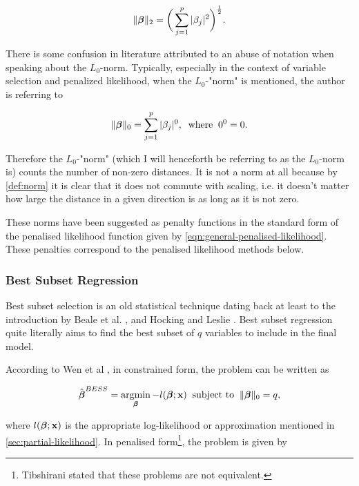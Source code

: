 \begin{definition}\label{def:euclidean-distance}
\begin{equation}\label{eqn:euclidean-distance}
    \Vert\boldsymbol{\beta}\Vert_2 = \bigg(\sum_{j=1}^p|\beta_j|^2\bigg)^{\frac{1}{2}}.
\end{equation}
\end{definition}

There is some confusion in literature attributed to an abuse of notation when speaking about the $L_0$-norm. Typically, especially in the context of variable selection and penalized likelihood, when the $L_0$-"norm" is mentioned, the author is referring to

\begin{equation}
    \Vert\boldsymbol{\beta}\Vert_0 =\sum_{j=1}^p|\beta_j|^0,\;\;\textrm{where}\;\;0^0=0.
\end{equation}

Therefore the $L_0$-"norm" (which I will henceforth be referring to as the $L_0$-norm is) counts the number of non-zero distances. It is not a norm at all because by \cref{def:norm} it is clear that it does not commute with scaling, i.e. it doesn't matter how large the distance in a given direction is as long as it is not zero.

These norms have been suggested as penalty functions in the standard form of the penalised likelihood function given by \cref{eqn:general-penalised-likelihood}. These penalties correspond to the penalised likelihood methods below.

\subsubsection{Best Subset Regression}

Best subset selection is an old statistical technique dating back at least to the introduction by Beale et al. , and Hocking and Leslie . Best subset regression quite literally aims to find the best subset of $q$ variables to include in the final model.

According to Wen et al , in constrained form, the problem can be written as

\begin{equation}
    \hat{\boldsymbol{\beta}}^{BESS}=\operatorname*{argmin}_{\boldsymbol{\beta}} -l(\boldsymbol{\beta};\textbf{x})\;\;\textrm{subject to}\;\;\Vert\boldsymbol{\beta}\Vert_0=q,
\end{equation}

where $l(\boldsymbol{\beta};\textbf{x})$ is the appropriate log-likelihood or approximation mentioned in \cref{sec:partial-likelihood}. In penalised form\footnote{Tibshirani  stated that these problems are not equivalent.}, the problem is given by

